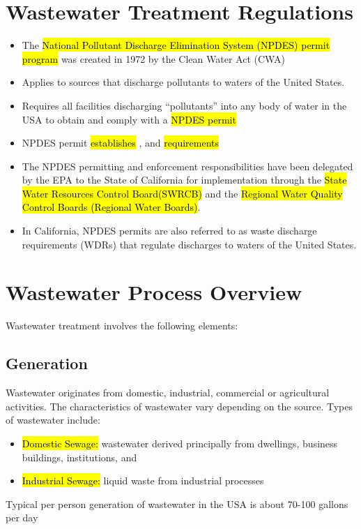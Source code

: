 \section{Wastewater Treatment Regulations}

\begin{itemize}
\item The \hl{National Pollutant Discharge Elimination System (NPDES) permit program} was created in 1972 by the Clean Water Act (CWA)
\item Applies to sources that discharge pollutants to waters of the United States.
\item Requires all facilities discharging “pollutants” into any body of water in the USA to obtain and comply with a \hl{NPDES permit}
\item NPDES permit \hl{establishes} ,  and  \hl{requirements}\\
\item The NPDES permitting and enforcement responsibilities have been delegated by the EPA to the State of California for implementation through the \hl{State Water Resources Control Board(SWRCB)} and the  \hl{Regional Water Quality Control Boards (Regional Water Boards)}.
\item In California, NPDES permits are also referred to as waste discharge requirements (WDRs) that regulate discharges to waters of the United States.
\end{itemize}


\section{Wastewater Process Overview}
Wastewater treatment involves the following elements:
\subsection{Generation}
Wastewater originates from domestic, industrial, commercial or agricultural activities. The characteristics of wastewater vary depending on the source. Types of wastewater include: 
\begin{itemize}
\item \hl{Domestic Sewage:}  wastewater derived principally from dwellings, business buildings, institutions, and \\
\item \hl{Industrial Sewage:}  liquid waste from industrial processes\\
\end{itemize}
Typical per person generation of wastewater in the USA is about 70-100 gallons per day

